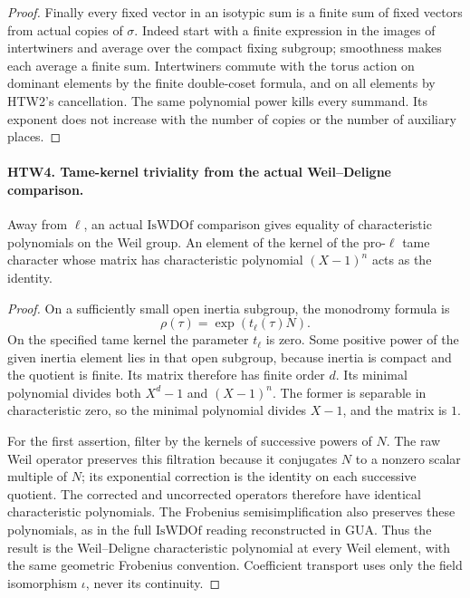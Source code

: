 \documentclass[11pt,a4paper]{article}
\numberwithin{equation}{section}
\theoremstyle{remark}\newtheorem{remark}[theorem]{Remark}
\begin{document}
\begin{proof}
Finally every fixed vector in an isotypic sum is a finite
sum of fixed vectors from actual copies of \(\sigma\).
Indeed start with a finite expression in the images of
intertwiners and average over the compact fixing subgroup;
smoothness makes each average a finite sum.  Intertwiners
commute with the torus action on dominant elements by the
finite double-coset formula, and on all elements by
HTW2's cancellation.  The same polynomial power kills
every summand.  Its exponent does not increase with the
number of copies or the number of auxiliary places.
\end{proof}

\paragraph{HTW4. Tame-kernel triviality from the actual Weil--Deligne comparison.}
\label{claim:HTW4}
Away from \(\ell\), an actual \(\mathrm{IsWDOf}\) comparison
gives equality of characteristic polynomials on the Weil
group.  An element of the kernel of the pro-\(\ell\) tame
character whose matrix has characteristic polynomial
\((X-1)^n\) acts as the identity.
\begin{proof}
On a sufficiently small open inertia subgroup, the
monodromy formula is
\[
                  \rho(\tau)=\exp(t_\ell(\tau)N).
\]
On the
specified tame kernel the parameter \(t_\ell\) is zero.
Some positive power of the given inertia element lies in
that open subgroup, because inertia is compact and the
quotient is finite.  Its matrix therefore has finite
order \(d\).  Its minimal polynomial divides both
\(X^d-1\) and \((X-1)^n\).  The former is separable in
characteristic zero, so the minimal polynomial divides
\(X-1\), and the matrix is \(1\).

For the first assertion, filter by the kernels of
successive powers of \(N\).  The raw Weil operator
preserves this filtration because it conjugates \(N\)
to a nonzero scalar multiple of \(N\); its exponential
correction is the identity on each successive quotient.
The corrected and uncorrected operators therefore
have identical characteristic polynomials.  The
Frobenius semisimplification also preserves these
polynomials, as in the full \(\mathrm{IsWDOf}\)
reading reconstructed in GUA.  Thus the result is the
Weil--Deligne characteristic polynomial at every Weil
element, with the same geometric Frobenius convention.
Coefficient transport uses only the field isomorphism
\(\iota\), never its continuity.
\end{proof}
\end{document}
